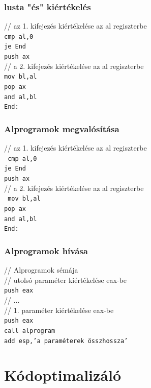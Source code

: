 \documentclass[12pt,margin=0px]{article}
\begin{document}
    \subsubsection*{ lusta "és" kiértékelés }
	
	// az 1. kifejezés kiértékelése az al regiszterbe\\
	\texttt{cmp al,0\\
	je End\\
	push ax}\\
	// a 2. kifejezés kiértékelése az al regiszterbe\\
	\texttt{mov bl,al\\
	pop ax\\
	and al,bl\\
	End:}

    \subsubsection*{ Alprogramok megvalósítása }
	
	
	// az 1. kifejezés kiértékelése az al regiszterbe\\
    \texttt{
    cmp al,0\\
	je End\\
	push ax}\\
	// a 2. kifejezés kiértékelése az al regiszterbe\\
    \texttt{
    mov bl,al\\
	pop ax\\
	and al,bl\\
	End:}
	
    \subsubsection*{ Alprogramok hívása }

	// Alprogramok sémája\\
	// utolsó paraméter kiértékelése eax-be\\
	\texttt{push eax}\\
	// ...\\
	// 1. paraméter kiértékelése eax-be\\
	\texttt{push eax\\
	call alprogram\\
	add esp,’a paraméterek összhossza’}
\newpage	
    \section*{Kódoptimalizáló}
	
\end{document}

